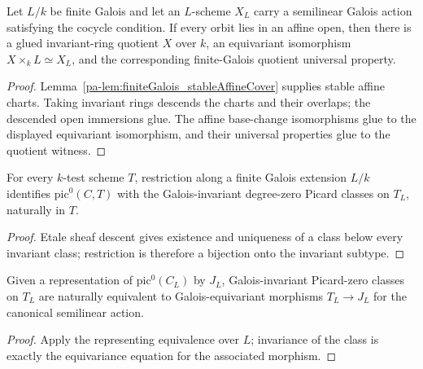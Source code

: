\begin{theorem}
  \label{pa-thm:finiteGalois_schemeDescent}
  \leanok

  Let \(L/k\) be finite Galois and let an \(L\)-scheme \(X_L\) carry a semilinear Galois
  action satisfying the cocycle condition.  If every orbit lies in an affine open, then there
  is a glued invariant-ring quotient \(X\) over \(k\), an equivariant isomorphism
  \(X\times_kL\simeq X_L\), and the corresponding finite-Galois quotient universal property.
\end{theorem}
\begin{proof}
  \leanok
  Lemma~\ref{pa-lem:finiteGalois_stableAffineCover} supplies stable affine charts.  Taking
  invariant rings descends the charts and their overlaps; the descended open immersions glue.
  The affine base-change isomorphisms glue to the displayed equivariant isomorphism, and their
  universal properties glue to the quotient witness.
\end{proof}

\begin{theorem}
  \label{pa-thm:pic0_finiteGalois_effectiveDescent}
  \leanok

  For every \(k\)-test scheme \(T\), restriction along a finite Galois extension \(L/k\)
  identifies \(\mathrm{pic}^0(C,T)\) with the Galois-invariant degree-zero Picard classes on
  \(T_L\), naturally in \(T\).
\end{theorem}
\begin{proof}
  \leanok
  Etale sheaf descent gives existence and uniqueness of a class below every invariant class;
  restriction is therefore a bijection onto the invariant subtype.
\end{proof}

\begin{theorem}
  \label{pa-thm:pic0_invariants_equivariant}
  \leanok

  Given a representation of \(\mathrm{pic}^0(C_L)\) by \(J_L\), Galois-invariant Picard-zero
  classes on \(T_L\) are naturally equivalent to Galois-equivariant morphisms
  \(T_L\to J_L\) for the canonical semilinear action.
\end{theorem}
\begin{proof}
  \leanok
  Apply the representing equivalence over \(L\); invariance of the class is exactly the
  equivariance equation for the associated morphism.
\end{proof}

